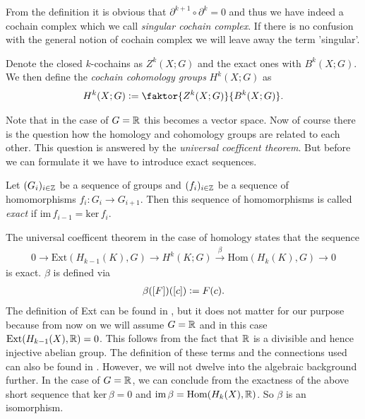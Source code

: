 \documentclass[../master_thesis.tex]{subfiles}
\begin{document}
From the definition it is obvious that $\partial^{k+1} \circ \partial^{k} = 0$ 
and thus we have indeed a cochain complex which we call \textit{singular cochain 
complex}. If there is no confusion with the general notion of cochain complex
we will leave away the term 'singular'.
\begin{definition}
    Denote the closed $k$-cochains as $Z^k(X;G)$ and the 
    exact ones with $B^k(X;G)$. 
    We then define the \textit{cochain cohomology groups}
    $H^k(X;G)$ as
    \begin{align*}
        H^k(X;G) \vcentcolon= \faktor{Z^k(X;G)}{B^k(X;G)}.
    \end{align*}
\end{definition}
Note that in the case of $G = \mathbb{R}$ this becomes a vector space.
Now of course there is the question how the homology and cohomology groups 
are related to each other. This question is answered by the
\textit{universal coefficent theorem}. But before we can formulate it we have 
to introduce exact sequences.
\begin{definition} \label{def:exact_sequence}
    Let $(G_i)_{i\in \mathbb{Z}}$ be a sequence of groups and 
    $(f_i)_{i \in \mathbb{Z}}$ be a sequence of homomorphisms
    $f_i: G_i \rightarrow G_{i+1}$. Then this sequence of homomorphisms is
    called \textit{exact} if $\text{im}\,f_{i-1} = \text{ker}\,f_i$.
\end{definition}

The universal coefficent theorem in the case of homology states
that the sequence 
\begin{align}
    0 \rightarrow \text{Ext}(H_{k-1}(K),G) \rightarrow 
    H^k(K;G) \xrightarrow{\beta} \text{Hom}(H_k(K),G) 
    \rightarrow 0 \label{eq:univeral_coefficient_theorem}
\end{align}
is exact. 
$\beta$ is defined via 
\begin{align}
    \beta([F])([c]) \vcentcolon= F(c).
    \label{eq:isomorphism_from_universal_coefficent_theorem}
\end{align}
The definition of Ext can be found in \cite{topology_and_geometry},
but it does not matter for our purpose because from now on we will assume
$G = \mathbb{R}$ and in this case
$\text{Ext}(H_{k-1}(X),\mathbb{R}) = 0$. This follows from the fact that 
$\mathbb{R}$ is a divisible and hence injective abelian group. The definition of
these terms and the connections used can also be found in 
\cite[Sec.\,V.6]{topology_and_geometry}. However, we will not dwelve into the 
algebraic background further. In the case of $G = \mathbb{R}$, 
we can conclude from the exactness of the 
above short sequence that $\text{ker}\,\beta = 0$ and 
$\text{im}\,\beta = \text{Hom}(H_k(X),\mathbb{R})$. So $\beta$ is an isomorphism.
\end{document}
